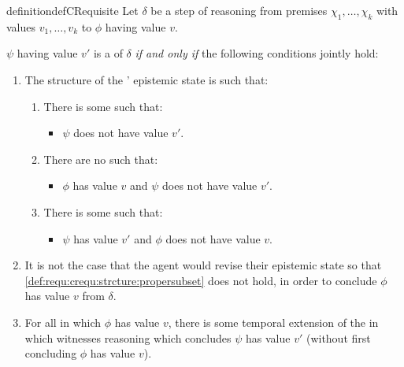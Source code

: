 \begin{note}
  \begin{restatable}{definition}{defCRequisite}
    \label{def:requ:crequ}
    Let \(\delta\) be a step of reasoning from premises \(\chi_{1},\dots,\chi_{k}\) with values \(v_{1},\dots,v_{k}\) to \(\phi\) having value \(v\).

    \(\psi\) having value \(v'\) is a \emph{\crequ{}} of \(\delta\) \emph{if and only if} the following conditions jointly hold:
    \begin{enumerate}[label=\arabic*., ref=\named{\ddag C\(\Re\):\arabic*}]
    \item
      \label{def:requ:crequ:strcture}
      The structure of the \vAgent{}' epistemic state is such that:
      \begin{enumerate}[label=\alph*., ref=\named{\ddag C\(\Re\):1\alph*}]
      \item
        \label{def:requ:crequ:strcture:psi-not-v}
        There is some \epVW{} such that:
        \begin{itemize}
        \item
          \(\psi\) does not have value \(v'\).
        \end{itemize}
      \item
        \label{def:requ:crequ:strcture:subset}
        There are no  such that:
        \begin{itemize}
        \item \(\phi\) has value \(v\) and \(\psi\) does not have value \(v'\).
        \end{itemize}
      \item
        \label{def:requ:crequ:strcture:propersubset}
        There is some \epVW{} such that:
        \begin{itemize}
        \item \(\psi\) has value \(v'\) and \(\phi\) does not have value \(v\).
        \end{itemize}
      \end{enumerate}
    \item
      \label{def:requ:crequ:no-revision}
      It is not the case that the agent would revise their epistemic state so that \ref{def:requ:crequ:strcture:propersubset} does not hold, in order to conclude \(\phi\) has value \(v\) from \(\delta\).
    \item
      \label{def:requ:crequ:possible-reason}
      For all \epVW{} in which \(\phi\) has value \(v\), there is some temporal extension of the \world{} in which \vAgent{} witnesses reasoning which concludes \(\psi\) has value \(v'\) (without first concluding \(\phi\) has value \(v\)).
    \end{enumerate}
    \vspace{-\baselineskip}
  \end{restatable}
\end{note}

